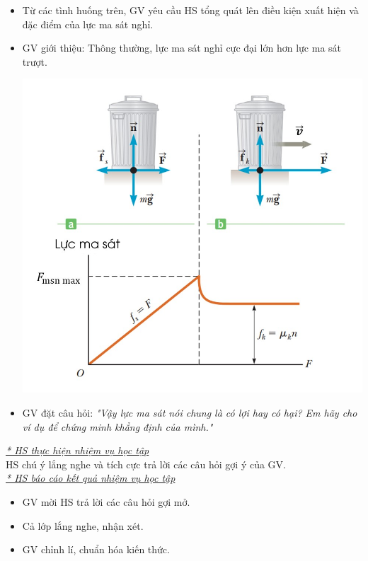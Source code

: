 {\begin{itemize}[label=-]
\begin{center}
		\end{center}
		\item Từ các tình huống trên, GV yêu cầu HS tổng quát lên điều kiện xuất hiện và đặc điểm của lực ma sát nghỉ.
		\item GV giới thiệu: Thông thường, lực ma sát nghỉ cực đại lớn hơn lực ma sát trượt.
		\begin{center}
			\includegraphics[scale=0.7]{figs/G10-BAI11-9}
		\end{center}
		\item GV đặt câu hỏi: \textit{"Vậy lực ma sát nói chung là có lợi hay có hại? Em hãy cho ví dụ để chứng minh khẳng định của mình."}
	\end{itemize}
	\textit{\underline{* HS thực hiện nhiệm vụ học tập}}\\
	HS chú ý lắng nghe và tích cực trả lời các câu hỏi gợi ý của GV.\\
	\textit{\underline{* HS báo cáo kết quả nhiệm vụ học tập}}
	\begin{itemize}[label=-]
		\item GV mời HS trả lời các câu hỏi gợi mở.
		\item Cả lớp lắng nghe, nhận xét.
		\item GV chỉnh lí, chuẩn hóa kiến thức.
	\end{itemize}
	
}
